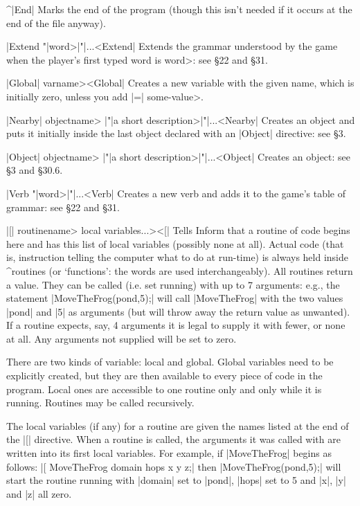 \noindent^|End|\quad
Marks the end of the program (though this isn't
needed if it occurs at the end of the file anyway).

\noindent|Extend "|\<word>|"|...\quad^^|Extend|
Extends the grammar understood by the game when the player's first
typed word is \<word>: see \S 22 and \S 31.

\noindent|Global| \<varname>^^|Global|\quad
Creates a new variable with the given name, which is initially zero,
unless you add |=| \<some-value>.

\noindent|Nearby| \<objectname> |"|\<a short description>|"|...^^|Nearby|\quad
Creates an object and puts it initially inside the last object
declared with an |Object| directive: see \S 3.

\noindent|Object| \<objectname> |"|\<a short description>|"|...^^|Object|\quad
Creates an object: see \S 3 and \S 30.6.

\noindent|Verb "|\<word>|"|...\quad^^|Verb|
Creates a new verb and adds it to the game's table of grammar:
see \S 22 and \S 31.

\noindent|[| \<routinename> \<local variables...>^^|[|\quad
Tells Inform that a routine of code begins here and has this list of
local variables (possibly none at all).
\medskip
\noindent
Actual code (that is, instruction telling the computer what to do
at run-time) is always held inside ^{routines} (or `functions': the words
are used interchangeably).  All routines return a value.  They can be
called (i.e. set running) with up to 7 arguments: e.g., the statement
|MoveTheFrog(pond,5);| will call |MoveTheFrog| with the two values
|pond| and |5| as arguments (but will throw away the return value as
unwanted).  If a routine expects, say, 4 arguments it is legal to supply
it with fewer, or none at all.  Any arguments not supplied will be set
to zero.

There are two kinds of variable: local and global.  Global variables need to
be explicitly created, but they are then available to every piece of code in
the program.  Local ones are accessible to one routine only and only while
it is running.  Routines may be called recursively.

The local variables (if any) for a routine are given the names listed at the
end of the |[| directive.  When a routine is called, the arguments it was
called with are written into its first local variables.  For example, if
|MoveTheFrog| begins as follows:
\begindisplay
|[ MoveTheFrog domain hops x y z;|\cr
\enddisplay
then |MoveTheFrog(pond,5);| will start the routine running with |domain|
set to |pond|, |hops| set to 5 and |x|, |y| and |z| all zero.

